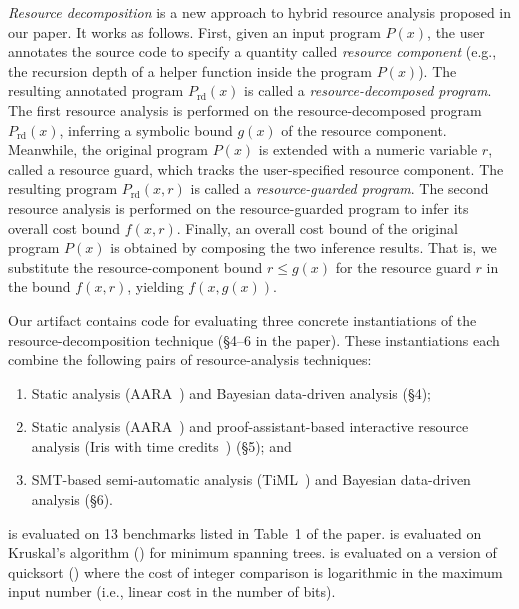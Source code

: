 \emph{Resource decomposition} is a new approach to hybrid resource analysis
proposed in our paper.
%
It works as follows.
%
First, given an input program $P(x)$, the user annotates the source code to
specify a quantity called \emph{resource component} (e.g., the recursion depth
of a helper function inside the program $P(x)$).
%
The resulting annotated program $P_{\mathrm{rd}}(x)$ is called a
\emph{resource-decomposed program}.
%
The first resource analysis is performed on the resource-decomposed program
$P_{\mathrm{rd}}(x)$, inferring a symbolic bound $g(x)$ of the resource
component.
%
Meanwhile, the original program $P(x)$ is extended with a numeric variable $r$,
called a resource guard, which tracks the user-specified resource component.
%
The resulting program $P_{\mathrm{rd}}(x, r)$ is called a \emph{resource-guarded
  program}.
%
The second resource analysis is performed on the resource-guarded program to
infer its overall cost bound $f(x, r)$.
%
Finally, an overall cost bound of the original program $P(x)$ is obtained by
composing the two inference results.
%
That is, we substitute the resource-component bound $r \leq g(x)$ for the
resource guard $r$ in the bound $f(x, r)$, yielding $f(x, g(x))$.

Our artifact contains code for evaluating three concrete instantiations of the
resource-decomposition technique (\S4--6 in the paper).
%
These instantiations each combine the following pairs of resource-analysis
techniques:
\begin{enumerate}[label={Inst. \arabic*}]
  \item Static analysis (AARA~\citep{Hoffmann2011a,Hoffmann2017}) and Bayesian
        data-driven analysis (\S4);
        \label{introduction:instantiation:1}
  \item Static analysis (AARA~\citep{Hoffmann2011a,Hoffmann2017}) and
        proof-assistant-based interactive resource analysis (Iris with time
        credits~\citep{Chargueraud2019}) (\S5); and
        \label{introduction:instantiation:2}
  \item SMT-based semi-automatic analysis (TiML~\citep{WangWC17}) and Bayesian
        data-driven analysis (\S6).
        \label{introduction:instantiation:3}
\end{enumerate}
%
 is evaluated on 13 benchmarks listed in
Table~1 of the paper.
%
 is evaluated on Kruskal's algorithm
(\kruskal{}) for minimum spanning trees.
%
 is evaluated on a version of quicksort
(\quicksorttiml{}) where the cost of integer comparison is logarithmic in the
maximum input number (i.e., linear cost in the number of bits).

